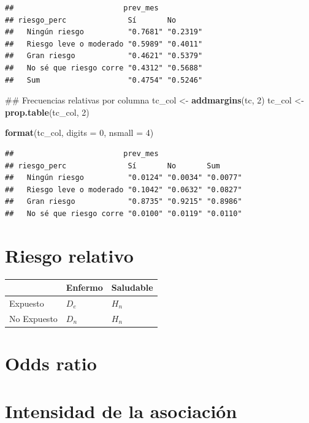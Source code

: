 \documentclass[spanish,]{book}
\newenvironment{Shaded}{\begin{snugshade}}{\end{snugshade}}
\newcommand{\KeywordTok}[1]{\textcolor[rgb]{0.13,0.29,0.53}{\textbf{#1}}}
\newcommand{\DataTypeTok}[1]{\textcolor[rgb]{0.13,0.29,0.53}{#1}}
\newcommand{\DecValTok}[1]{\textcolor[rgb]{0.00,0.00,0.81}{#1}}
\newcommand{\StringTok}[1]{\textcolor[rgb]{0.31,0.60,0.02}{#1}}
\newcommand{\NormalTok}[1]{#1}
\begin{document}
\begin{verbatim}
##                         prev_mes
## riesgo_perc              Sí       No      
##   Ningún riesgo          "0.7681" "0.2319"
##   Riesgo leve o moderado "0.5989" "0.4011"
##   Gran riesgo            "0.4621" "0.5379"
##   No sé que riesgo corre "0.4312" "0.5688"
##   Sum                    "0.4754" "0.5246"
\end{verbatim}

\begin{Shaded}
\begin{Highlighting}[]
\NormalTok{## Frecuencias relativas por columna}
\NormalTok{tc_col <-}\StringTok{ }\KeywordTok{addmargins}\NormalTok{(tc, }\DecValTok{2}\NormalTok{)}
\NormalTok{tc_col <-}\StringTok{ }\KeywordTok{prop.table}\NormalTok{(tc_col, }\DecValTok{2}\NormalTok{)}

\KeywordTok{format}\NormalTok{(tc_col, }\DataTypeTok{digits =} \DecValTok{0}\NormalTok{, }\DataTypeTok{nsmall =} \DecValTok{4}\NormalTok{)}
\end{Highlighting}
\end{Shaded}

\begin{verbatim}
##                         prev_mes
## riesgo_perc              Sí       No       Sum     
##   Ningún riesgo          "0.0124" "0.0034" "0.0077"
##   Riesgo leve o moderado "0.1042" "0.0632" "0.0827"
##   Gran riesgo            "0.8735" "0.9215" "0.8986"
##   No sé que riesgo corre "0.0100" "0.0119" "0.0110"
\end{verbatim}

\section{Riesgo relativo}\label{riesgo-relativo}

\begin{longtable}[]{@{}lll@{}}
\toprule
& Enfermo & Saludable\tabularnewline
\midrule
\endhead
Expuesto & \(D_e\) & \(H_n\)\tabularnewline
No Expuesto & \(D_n\) & \(H_n\)\tabularnewline
\bottomrule
\end{longtable}

\section{Odds ratio}\label{odds-ratio}

\section{Intensidad de la asociación}\label{intensidad-de-la-asociacion}
\end{document}
